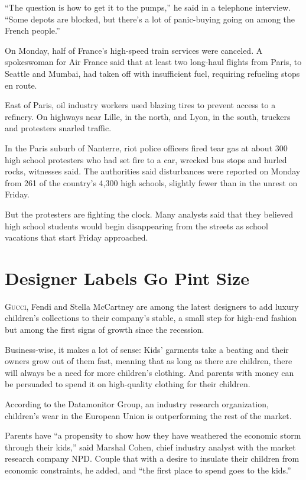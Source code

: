 ﻿\documentclass[12pt]{article}
\begin{document}
``The question is how to get it to the pumps,'' he said in a telephone interview. ``Some depots are
blocked, but there's a lot of panic-buying going on among the French people.''

On Monday, half of France's high-speed train services were canceled. A spokeswoman for Air France
said that at least two long-haul flights from Paris, to Seattle and Mumbai, had taken off with
insufficient fuel, requiring refueling stops en route.

East of Paris, oil industry workers used blazing tires to prevent access to a refinery. On highways
near Lille, in the north, and Lyon, in the south, truckers and protesters snarled traffic.

In the Paris suburb of Nanterre, riot police officers fired tear gas at about 300 high school
protesters who had set fire to a car, wrecked bus stops and hurled rocks, witnesses said. The
authorities said disturbances were reported on Monday from 261 of the country's 4,300 high schools,
slightly fewer than in the unrest on Friday.

But the protesters are fighting the clock. Many analysts said that they believed high school
students would begin disappearing from the streets as school vacations that start Friday approached.

\section{Designer Labels Go Pint Size}

\lettrine{G}{ucci}, Fendi and Stella McCartney are among the latest
designers to add luxury children's collections to their company's stable, a small step for high-end
fashion but among the first signs of growth since the recession.

Business-wise, it makes a lot of sense: Kids' garments take a beating and their owners grow out of
them fast, meaning that as long as there are children, there will always be a need for more
children's clothing. And parents with money can be persuaded to spend it on high-quality clothing
for their children.

According to the Datamonitor Group, an industry research organization, children's wear in the
European Union is outperforming the rest of the market.

Parents have ``a propensity to show how they have weathered the economic storm through their kids,''
said Marshal Cohen, chief industry analyst with the market research company NPD. Couple that with a
desire to insulate their children from economic constraints, he added, and ``the first place to
spend goes to the kids.''
\end{document}

